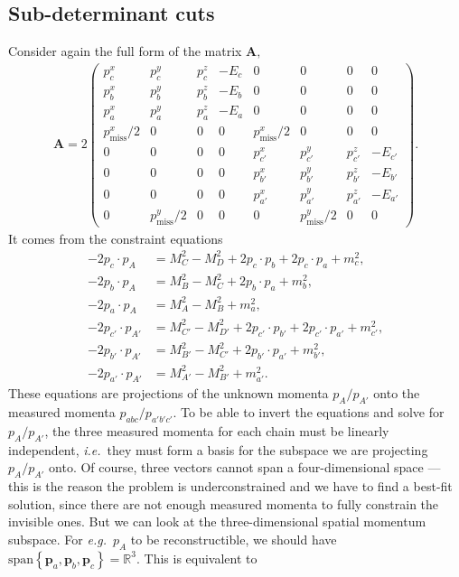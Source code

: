 \documentclass[twoside,english]{uiofysmaster}
\begin{document}
\subsection{Sub-determinant cuts}
Consider again the full form of the matrix $\mathbf{A},$
\begin{align}
	\mathbf{A} = 2 \begin{pmatrix}
						p_c^x & p_c^y & p_c^z & -E_c & 0 & 0 & 0 & 0 \\
						p_b^x & p_b^y & p_b^z & -E_b & 0 & 0 & 0 & 0 \\
						p_a^x & p_a^y & p_a^z & -E_a & 0 & 0 & 0 & 0 \\
						p_\mathrm{miss}^x/2 & 0 & 0 & 0 & p_\mathrm{miss}^x/2 & 0 & 0 & 0\\
						0 & 0 & 0 & 0 & p_{c'}^x & p_{c'}^y & p_{c'}^z & -E_{c'} \\
						0 & 0 & 0 & 0 & p_{b'}^x & p_{b'}^y & p_{b'}^z & -E_{b'} \\
						0 & 0 & 0 & 0 & p_{a'}^x & p_{a'}^y & p_{a'}^z & -E_{a'} \\
						0 & p_\mathrm{miss}^y/2 & 0 & 0 & 0 & p_\mathrm{miss}^y/2 & 0 & 0
					\end{pmatrix}. \label{eq:Amatrix_modified_subdetAcut}
\end{align}
It comes from the constraint equations
\begin{align}
	-2p_c\cdot p_A &= M_C^2 - M_D^2 + 2p_c\cdot p_b + 2p_c \cdot p_a + m_c^2,\nonumber \\
	-2p_b\cdot p_A &= M_B^2 - M_C^2 + 2p_b\cdot p_a + m_b^2 ,\nonumber\\
	-2p_a\cdot p_A &= M_A^2 - M_B^2 + m_a^2 ,\\ 
	-2p_{c'}\cdot p_{A'} &= M_{C'}^2 - M_{D'}^2 + 2p_{c'}\cdot p_{b'} + 2p_{c'} \cdot p_{a'} + m_{c'}^2,\nonumber \\ 
	-2p_{b'}\cdot p_{A'} &= M_{B'}^2 - M_{C'}^2 + 2p_{b'}\cdot p_{a'} + m_{b'}^2,\nonumber\\
	-2p_{a'}\cdot p_{A'} &= M_{A'}^2 - M_{B'}^2 + m_{a'}^2.\nonumber
\end{align}
These equations are projections of the unknown momenta $p_A / p_{A'}$ onto the measured momenta $p_{abc} / p_{a'b'c'}$. To be able to invert the equations and solve for $p_A / p_{A'}$, the three measured momenta for each chain must be linearly independent, {\it i.e.}\ they must form a basis for the subspace we are projecting $p_A/p_{A'}$ onto. Of course, three vectors cannot span a four-dimensional space --- this is the reason the problem is underconstrained and we have to find a best-fit solution, since there are not enough measured momenta to fully constrain the invisible ones. But we can look at the three-dimensional spatial momentum subspace. For {\it e.g.}\ $p_A$ to be reconstructible, we should have $\mathrm{span}\left\{ \mathbf p_a, \mathbf p_b, \mathbf p_c \right\} = \mathbb{R}^3$. This is equivalent to
\end{document}
